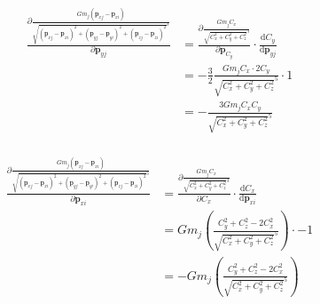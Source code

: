 \documentclass[12pt,letterpaper]{article}
\newcommand{\vep}{\bm{p}}
\newcommand{\der}[2]{\frac{\text{d} #1}{\text{d} #2}}
\newcommand{\pard}[2]{\frac{\partial #1}{\partial #2}}
\begin{document}
    \begin{align*}
        \pard{\frac{Gm_j(\vep_{xj}-\vep_{xi})}{\sqrt{(\vep_{xj}-\vep_{xi})^2+(\vep_{yj}-\vep_{yi})^2+(\vep_{zj}-\vep_{zi})^2}^3}}{\vep_{yj}}
        &=\pard{\frac{Gm_jC_x}{\sqrt{C_x^2+C_y^2+C_z^2}^3}}{\vep_{C_y}}\cdot\der{C_y}{\vep_{yj}}\\
        &=-\frac{3}{2}\frac{Gm_jC_x\cdot 2C_y}{\sqrt{C_x^2+C_y^2+C_z^2}^5}\cdot1\\
        &=-\frac{3Gm_jC_xC_y}{\sqrt{C_x^2+C_y^2+C_z^2}^5}\\
    \end{align*}

    \begin{align*}
        \pard{\frac{Gm_j(\vep_{xj}-\vep_{xi})}{\sqrt{(\vep_{xj}-\vep_{xi})^2+(\vep_{yj}-\vep_{yi})^2+(\vep_{zj}-\vep_{zi})^2}^3}}{\vep_{xi}}
        &=\pard{\frac{Gm_jC_x}{\sqrt{C_x^2+C_y^2+C_z^2}^3}}{C_x} \cdot \der{C_x}{\vep_{xi}}\\
        &=Gm_j\left(\frac{C_y^2+C_z^2-2C_x^2}{\sqrt{C_x^2+C_y^2+C_z^2}^5}\right) \cdot -1\\
        &=-Gm_j\left(\frac{C_y^2+C_z^2-2C_x^2}{\sqrt{C_x^2+C_y^2+C_z^2}^5}\right)\\
    \end{align*}
\end{document}
